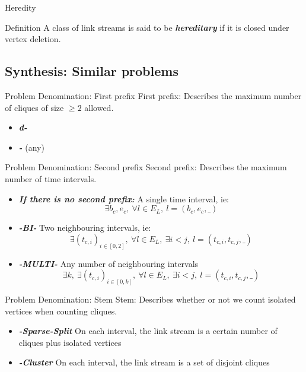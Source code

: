 \documentclass{beamer}
\begin{document}
\begin{frame}{Heredity}
  \begin{block}{Definition}
    A class of link streams is said to be \emph{\bfseries hereditary} if it is closed under vertex deletion.
  \end{block}
\end{frame}
\subsection{Synthesis: Similar problems}
\begin{frame}{Problem Denomination: First prefix}
  First prefix: Describes the maximum number of cliques of size $\geq 2$ allowed.
  \begin{itemize}
  \item \emph{\bfseries d-}
  \item \emph{\bfseries *-} (any)
  \end{itemize}
\end{frame}
\begin{frame}{Problem Denomination: Second prefix}
  Second prefix: Describes the maximum number of time intervals.
  \begin{itemize}
  \item \emph{\bfseries If there is no second prefix: } A single time interval, ie: $$\exists b_c, e_c,\ \forall l\in E_L,\ l=(b_c,e_c,\_)$$
  \item \emph{\bfseries -BI-} Two neighbouring intervals, ie: $$\exists (t_{c,i})_{i\in [0,2]},\ \forall l\in E_L,\ \exists i<j,\ l=(t_{c,i},t_{c,j},\_)$$
  \item \emph{\bfseries -MULTI-} Any number of neighbouring intervals $$\exists k,\ \exists (t_{c,i})_{i\in [0,k]},\ \forall l\in E_L,\ \exists i<j,\ l=(t_{c,i},t_{c,j},\_)$$
  \end{itemize}
\end{frame}
\begin{frame}{Problem Denomination: Stem}
  Stem: Describes whether or not we count isolated vertices when counting cliques.
  \begin{itemize}
  \item \emph{\bfseries -Sparse-Split} On each interval, the link stream is a certain number of cliques plus isolated vertices
  \item \emph{\bfseries -Cluster} On each interval, the link stream is a set of disjoint cliques
  \end{itemize}
\end{frame}
\end{document}

